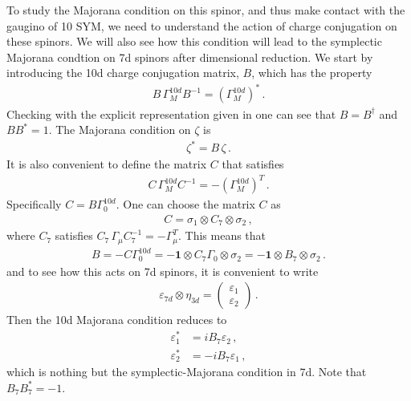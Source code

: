 \documentclass[12pt]{article}%
\numberwithin{equation}{section}
\newcommand{\al}[1]{\begin{align}#1\end{align}}
\renewcommand{\(}{\left(}
\renewcommand{\)}{\right)}
\renewcommand{\[}{\left[}
\renewcommand{\]}{\right]}
\begin{document}
To study the Majorana condition on this spinor, and thus make contact with the gaugino of 10 SYM, we need to understand the action of charge conjugation on these spinors. We will also see how this condition will lead to the symplectic Majorana condtion on 7d spinors after dimensional reduction. We start by introducing the 10d charge conjugation matrix, $B$, which has the property
%
\al{ B \, \Gamma^{10d}_M B^{-1} = (\Gamma^{10d}_M)^*\,.
}
%
Checking with the explicit representation given in \cite{Polchinski:1998rr} one can see that $B = B^\dag$ and $B B^* = 1$. The Majorana condition on $\zeta$ is
%
\al{ \zeta^* = B\, \zeta\,.
}
%
It is also convenient to define the matrix $C$ that satisfies
%
\al{ C \,\Gamma^{10d}_M C^{-1} = - (\Gamma^{10d}_M)^{T}\,.
}
%
Specifically $C = B \Gamma^{10d}_0$. One can choose the matrix $C$ as
%
\al{ C = \sigma_1 \otimes C_7 \otimes \sigma_2\,,
}
%
where $C_7$ satisfies $C_7\, \Gamma_\mu C_7^{-1} = - \Gamma_\mu^T$. This means that
%
\al{ B = -C \Gamma^{10d}_0 = - \mathbf{1} \otimes C_7 \Gamma_0 \otimes \sigma_2 = - \mathbf{1} \otimes B_7 \otimes \sigma_2\,.
}
%
and to see how this acts on 7d spinors, it is convenient to write
%
\al{ \varepsilon_{7d} \otimes \eta_{3d} = \left(\begin{array}{c}\varepsilon_1 \\ \varepsilon_2 \end{array}\right)\,.
}
%
Then the 10d Majorana condition reduces to
%
\al{ \varepsilon_1^* &= i B_7 \varepsilon_2\,,\\
\varepsilon_2^* &= -i B_7 \varepsilon_1\,,
}
%
which is nothing but the symplectic-Majorana condition in 7d. Note that $B_7 B_7^* = -1$.


%
%
\end{document}

